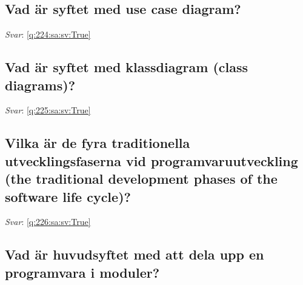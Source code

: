 \documentclass[a4paper,11pt,oneside]{article}
\begin{document}
\begin{sloppypar}
\subsection{Vad \"ar syftet med use case diagram?}

\label{q:224:sa:sv:False}

\vspace{2cm}

\noindent\makebox[\textwidth]{\hrulefill}

\vspace{1cm}

\textit{Svar}: \autoref{q:224:sa:sv:True}



\subsection{Vad \"ar syftet med klassdiagram (class diagrams)?}

\label{q:225:sa:sv:False}

\vspace{2cm}

\noindent\makebox[\textwidth]{\hrulefill}

\vspace{1cm}

\textit{Svar}: \autoref{q:225:sa:sv:True}



\subsection{Vilka \"ar de fyra traditionella utvecklingsfaserna vid programvaruutveckling (the traditional development phases of the software life cycle)?}

\label{q:226:sa:sv:False}

\vspace{2cm}

\noindent\makebox[\textwidth]{\hrulefill}

\vspace{1cm}

\textit{Svar}: \autoref{q:226:sa:sv:True}



\subsection{Vad \"ar huvudsyftet med att dela upp en programvara i moduler?}

\label{q:227:sa:sv:False}


\end{sloppypar}
\end{document}
